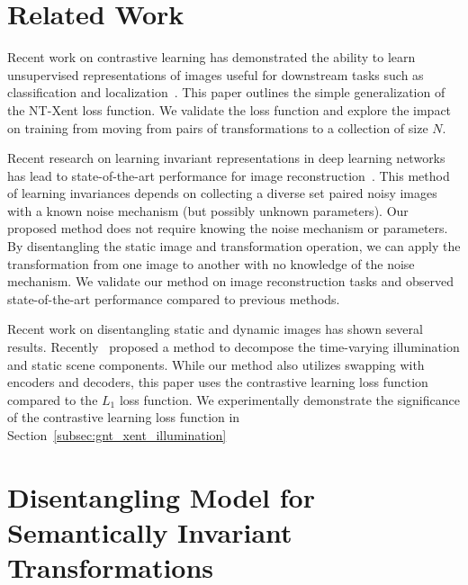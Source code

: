 \documentclass[11pt]{article}
\begin{document}
\section{Related Work}


Recent work on contrastive learning has demonstrated the ability to learn unsupervised representations of images useful for downstream tasks such as classification and localization~\cite{chen2020simple}. This paper outlines the simple generalization of the NT-Xent loss function. We validate the loss function and explore the impact on training from moving from pairs of transformations to a collection of size $N$. 

Recent research on learning invariant representations in deep learning networks has lead to state-of-the-art performance for image reconstruction~\cite{xia2019training}. This method of learning invariances depends on collecting a diverse set paired noisy images with a known noise mechanism (but possibly unknown parameters). Our proposed method does not require knowing the noise mechanism or parameters. By disentangling the static image and transformation operation, we can apply the transformation from one image to another with no knowledge of the noise mechanism. 
We validate our method on image reconstruction tasks and observed state-of-the-art performance compared to previous methods.


Recent work on disentangling static and dynamic images has shown several results. Recently~\cite{liu2020learning} proposed a method to decompose the time-varying illumination and static scene components. While our method also utilizes swapping with encoders and decoders, this paper uses the contrastive learning loss function compared to the $L_1$ loss function. We experimentally demonstrate the significance of the contrastive learning loss function in Section~\ref{subsec:gnt_xent_illumination}


\section{Disentangling Model for Semantically Invariant Transformations}
\end{document}
